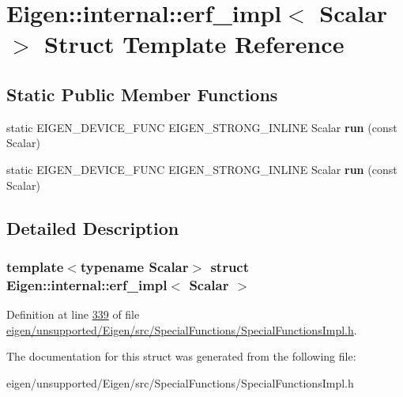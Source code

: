 \hypertarget{struct_eigen_1_1internal_1_1erf__impl}{}\section{Eigen\+:\+:internal\+:\+:erf\+\_\+impl$<$ Scalar $>$ Struct Template Reference}
\label{struct_eigen_1_1internal_1_1erf__impl}
\subsection*{Static Public Member Functions}
\begin{DoxyCompactItemize}
\item 
\mbox{\label{struct_eigen_1_1internal_1_1erf__impl_aff48381eacda58dfb87c4b7f8f25677c}} 
static E\+I\+G\+E\+N\+\_\+\+D\+E\+V\+I\+C\+E\+\_\+\+F\+U\+NC E\+I\+G\+E\+N\+\_\+\+S\+T\+R\+O\+N\+G\+\_\+\+I\+N\+L\+I\+NE Scalar {\bfseries run} (const Scalar)
\item 
\mbox{\label{struct_eigen_1_1internal_1_1erf__impl_aff48381eacda58dfb87c4b7f8f25677c}} 
static E\+I\+G\+E\+N\+\_\+\+D\+E\+V\+I\+C\+E\+\_\+\+F\+U\+NC E\+I\+G\+E\+N\+\_\+\+S\+T\+R\+O\+N\+G\+\_\+\+I\+N\+L\+I\+NE Scalar {\bfseries run} (const Scalar)
\end{DoxyCompactItemize}


\subsection{Detailed Description}
\subsubsection*{template$<$typename Scalar$>$\newline
struct Eigen\+::internal\+::erf\+\_\+impl$<$ Scalar $>$}



Definition at line \hyperlink{eigen_2unsupported_2_eigen_2src_2_special_functions_2_special_functions_impl_8h_source_l00339}{339} of file \hyperlink{eigen_2unsupported_2_eigen_2src_2_special_functions_2_special_functions_impl_8h_source}{eigen/unsupported/\+Eigen/src/\+Special\+Functions/\+Special\+Functions\+Impl.\+h}.



The documentation for this struct was generated from the following file\+:\begin{DoxyCompactItemize}
\item 
eigen/unsupported/\+Eigen/src/\+Special\+Functions/\+Special\+Functions\+Impl.\+h\end{DoxyCompactItemize}
